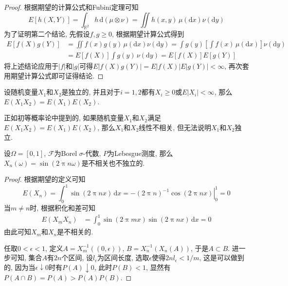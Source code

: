 \documentclass[cn, 12pt, math=mtpro2, bibstyle=apa, blue, twocol]{elegantbook}
\newcommand{\F}{\mathcal{F}}
\newcommand{\R}{\mathbb{R}}
\begin{document}
\begin{proof}
  根据期望的计算公式和Fubini定理可知
  $$E[h(X,Y)]=\int_{\R^2}h\,\text{d}(\mu\otimes\nu)=\iint h(x,y)\,\mu(\text{d}x)\nu(\text{d}y)$$
  为了证明第二个结论, 先假设$f,g\geq 0$, 根据期望计算公式得到
  \begin{align*}
  E[f(X)g(Y)]&=\iint f(x)g(y)\,\mu(\text{d}x)\nu(\text{d}y)=\int g(y)\left[\int f(x)\,\mu(\text{d}x)\right]\nu(\text{d}y) \\
  &=E[f(X)]\int g(y)\,\nu(\text{d}y)=E[f(X)]E[g(Y)]
  \end{align*}
  将上述结论应用于$|f|$和$|g|$可得$E|f(X)g(Y)|=E|f(X)|E|g(Y)|<\infty$, 再次套用期望计算公式即可证得结论.
\end{proof}
\begin{corollary}
  设随机变量$X_1$和$X_2$是独立的, 并且对于$i=1,2$都有$X_i\geq 0$或$E|X_i|<\infty$, 那么
  $E(X_1X_2)=E(X_1)E(X_2)$.
\end{corollary}

\begin{remark}
正如初等概率论中提到的, 如果随机变量$X_1$和$X_2$满足$E(X_1X_2)=E(X_1)E(X_2)$, 那么$X_1$和$X_2$线性不相关, 但无法说明$X_1$和$X_2$独立.
\end{remark}

\begin{example}
设$\Omega=[0,1]$, $\F$为Borel $\sigma$-代数, $P$为Lebesgue测度, 那么$X_n(\omega)=\sin(2\uppi n\omega)$是不相关也不独立的.
\end{example}
\begin{proof}
  根据期望的定义可知
  $$E(X_n)=\int_{0}^{1}\sin(2\uppi nx)\,\text{d}x=\left.-(2\uppi n)^{-1}\cos(2\uppi nx)\right|_0^1=0$$
  当$m\neq n$时, 根据积化和差可知
  \begin{align*}
  E(X_mX_n)&=\int_{0}^{1}\sin(2\uppi mx)\sin(2\uppi nx)\,\text{d}x=0
  \end{align*}
  由此可知$X_m$和$X_n$是不相关的.

  任取$0<\epsilon<1$, 定义$A=X_m^{-1}((0,\epsilon))$, $B=X_n^{-1}(X_n(A))$, 于是$A\subset B$. 进一步可知, 集合$A$有$2n$个区间, 设$l_\epsilon$为区间长度, 选取$\epsilon$使得$2nl_\epsilon<1/m$, 这是可以做到的, 因为当$\epsilon\downarrow0$时有$P(A)\downarrow 0$, 此时$P(B)<1$, 显然有$P(A\cap B)=P(A)>P(A)P(B)$.
\end{proof}
\end{document}
